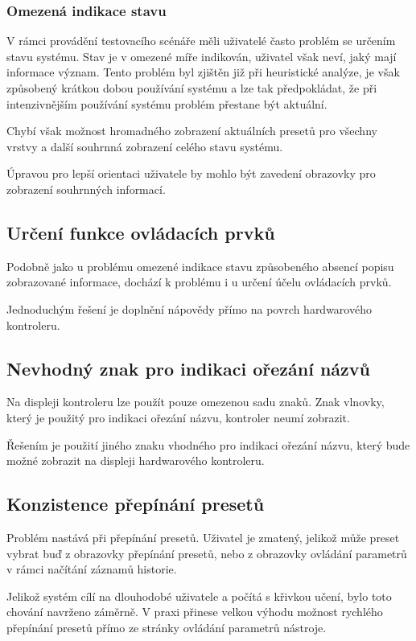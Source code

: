 \documentclass[thesis=M,czech]{FITthesis}[2019/03/06]
\begin{document}
			\subsubsection{Omezená indikace stavu}
				V rámci provádění testovacího scénáře měli uživatelé často problém se určením stavu systému. Stav je v omezené míře indikován, uživatel však neví, jaký mají informace význam. Tento problém byl zjištěn již při heuristické analýze, je však způsobený krátkou dobou používání systému a lze tak předpokládat, že při intenzivnějším používání systému problém přestane být aktuální.
				
				Chybí však možnost hromadného zobrazení aktuálních presetů pro všechny vrstvy a další souhrnná zobrazení celého stavu systému.
				
				Úpravou pro lepší orientaci uživatele by mohlo být zavedení obrazovky pro zobrazení souhrnných informací.
				
			\subsection{Určení funkce ovládacích prvků}
				Podobně jako u problému omezené indikace stavu způsobeného absencí popisu zobrazované informace, dochází k problému i u určení účelu ovládacích prvků.
				
				Jednoduchým řešení je doplnění nápovědy přímo na povrch hardwarového kontroleru.
			
			\subsection{Nevhodný znak pro indikaci ořezání názvů}
				Na displeji kontroleru lze použít pouze omezenou sadu znaků. Znak vlnovky, který je použitý pro indikaci ořezání názvu, kontroler neumí zobrazit. 
				
				Řešením je použití jiného znaku vhodného pro indikaci ořezání názvu, který bude možné zobrazit na displeji hardwarového kontroleru.
				
			\subsection{Konzistence přepínání presetů}
				Problém nastává při přepínání presetů. Uživatel je zmatený, jelikož může preset vybrat buď z obrazovky přepínání presetů, nebo z obrazovky ovládání parametrů v rámci načítání záznamů historie.
				
				Jelikož systém cílí na dlouhodobé uživatele a počítá s křivkou učení, bylo toto chování navrženo záměrně. V praxi přinese velkou výhodu možnost rychlého přepínání presetů přímo ze stránky ovládání parametrů nástroje.
				
\end{document}
